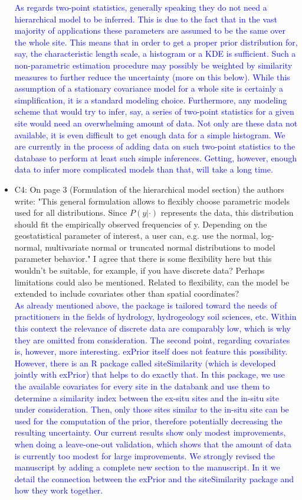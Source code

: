 \documentclass{article}
\begin{document}
\begin{itemize}
    \textcolor{blue}{As regards two-point statistics, generally speaking they do not need a hierarchical model to be inferred. This is due to the fact that in the vast majority of applications these parameters are assumed to be the same over the whole site. This means that in order to get a proper prior distribution for, say, the characteristic length scale, a histogram or a KDE is sufficient. Such a non-parametric estimation procedure may possibly be weighted by similarity measures to further reduce the uncertainty (more on this below). While this assumption of a stationary covariance model for a whole site is certainly a simplification, it is a standard modeling choice. Furthermore, any modeling scheme that would try to infer, say, a series of two-point statistics for a given site would need an overwhelming amount of data. Not only are these data not available, it is even difficult to get enough data for a simple histogram. We are currently in the process of adding data on such two-point statistics to the database to perform at least such simple inferences. Getting, however, enough data to infer more complicated models than that, will take a long time.}
    
    \item C4: On page 3 (Formulation of the hierarchical model section) the authors write: "This general formulation allows to flexibly choose parametric models used for all distributions. Since $P(y|\cdot)$ represents the data, this distribution should fit the empirically observed frequencies of y. Depending on the geostatistical parameter of interest, a user can, e.g. use the normal, log-normal, multivariate normal or truncated normal distributions to model parameter behavior." I agree that there is some flexibility here but this wouldn’t be suitable, for example, if you have discrete data? Perhaps limitations could also be mentioned. Related to flexibility, can the model be extended to include covariates other than spatial coordinates?\\
    \textcolor{blue}{As already mentioned above, the package is tailored toward the needs of practitioners in the fields of hydrology, hydrogeology soil sciences, etc. Within this context the relevance of discrete data are comparably low, which is why they are omitted from consideration. The second point, regarding covariates is, however, more interesting. exPrior itself does not feature this possibility. However, there is an R package called siteSimilarity (which is developed jointly with exPrior) that helps to do exactly that. In this package, we use the available covariates for every site in the databank and use them to determine a similarity index between the ex-situ sites and the in-situ site under consideration. Then, only those sites similar to the in-situ site can be used for the computation of the prior, therefore potentially decreasing the resulting uncertainty. Our current results show only modest improvements, when doing a leave-one-out validation, which shows that the amount of data is currently too modest for large improvements. We strongly revised the manuscript by adding a complete new section to the manuscript. In it we detail the connection between the exPrior and the siteSimilarity package and how they work together.}
    

\end{itemize}
\end{document}
